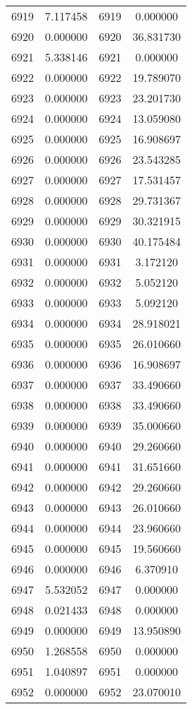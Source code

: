 \documentclass[12pt]{article}
\begin{document}
\begin{longtable}{@{}cccc@{}}
6919 & 7.117458 & 6919 & 0.000000 \\
6920 & 0.000000 & 6920 & 36.831730 \\
6921 & 5.338146 & 6921 & 0.000000 \\
6922 & 0.000000 & 6922 & 19.789070 \\
6923 & 0.000000 & 6923 & 23.201730 \\
6924 & 0.000000 & 6924 & 13.059080 \\
6925 & 0.000000 & 6925 & 16.908697 \\
6926 & 0.000000 & 6926 & 23.543285 \\
6927 & 0.000000 & 6927 & 17.531457 \\
6928 & 0.000000 & 6928 & 29.731367 \\
6929 & 0.000000 & 6929 & 30.321915 \\
6930 & 0.000000 & 6930 & 40.175484 \\
6931 & 0.000000 & 6931 & 3.172120 \\
6932 & 0.000000 & 6932 & 5.052120 \\
6933 & 0.000000 & 6933 & 5.092120 \\
6934 & 0.000000 & 6934 & 28.918021 \\
6935 & 0.000000 & 6935 & 26.010660 \\
6936 & 0.000000 & 6936 & 16.908697 \\
6937 & 0.000000 & 6937 & 33.490660 \\
6938 & 0.000000 & 6938 & 33.490660 \\
6939 & 0.000000 & 6939 & 35.000660 \\
6940 & 0.000000 & 6940 & 29.260660 \\
6941 & 0.000000 & 6941 & 31.651660 \\
6942 & 0.000000 & 6942 & 29.260660 \\
6943 & 0.000000 & 6943 & 26.010660 \\
6944 & 0.000000 & 6944 & 23.960660 \\
6945 & 0.000000 & 6945 & 19.560660 \\
6946 & 0.000000 & 6946 & 6.370910 \\
6947 & 5.532052 & 6947 & 0.000000 \\
6948 & 0.021433 & 6948 & 0.000000 \\
6949 & 0.000000 & 6949 & 13.950890 \\
6950 & 1.268558 & 6950 & 0.000000 \\
6951 & 1.040897 & 6951 & 0.000000 \\
6952 & 0.000000 & 6952 & 23.070010 \\

\end{longtable}
\end{document}
